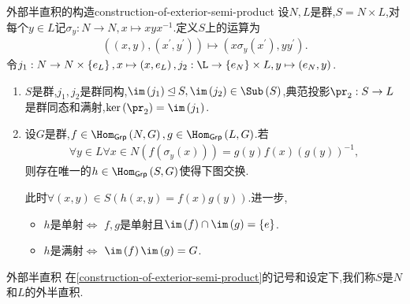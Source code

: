 \begin{proposition}{外部半直积的构造}{construction-of-exterior-semi-product}
	设$N,L$是群,$S=N\times L$,对每个$y\in L$记$\sigma_{y}:N\to N,x\mapsto xyx^{-1}$.定义$S$上的运算为
	\begin{align*}
		\left(\left(x,y\right),\left(x^{\prime},y^{\prime}\right)\right)\mapsto\left(x\sigma_{y}\left(x^{\prime}\right),yy^{\prime}\right).
	\end{align*}
	令$j_{1}:N\to N\times\left\{e_{L}\right\},x\mapsto\left(x,e_{L}\right),j_{2}:\L\to\left\{e_{N}\right\}\times L,y\mapsto\left(e_{N},y\right)$.
	\begin{enumerate}
		\item $S$是群,$j_{1},j_{2}$是群同构,$\im\left(j_{1}\right)\unlhd S,\im\left(j_{2}\right)\in\Sub\left(S\right)$,典范投影$\pr_{2}:S\to L$是群同态和满射,$\ker\left(\pr_{2}\right)=\im\left(j_{1}\right)$.
		\item 设$G$是群,$f\in\Hom_{\mathsf{Grp}}\left(N,G\right),g\in\Hom_{\mathsf{Grp}}\left(L,G\right)$.若
		\begin{align*}
			\forall y\in L\forall x\in N\left(f\left(\sigma_{y}\left(x\right)\right)\right)=g\left(y\right)f\left(x\right)\left(g\left(y\right)\right)^{-1},
		\end{align*}
		则存在唯一的$h\in\Hom_{\mathsf{Grp}}\left(S,G\right)$使得下图交换.
		\begin{center}
		\end{center}
		此时$\forall\left(x,y\right)\in S\left(h\left(x,y\right)=f\left(x\right)g\left(y\right)\right)$.进一步,
		\begin{itemize}
			\item $h$是单射$\iff$ $f,g$是单射且$\im\left(f\right)\cap\im\left(g\right)=\left\{e\right\}$.
			\item $h$是满射$\iff$ $\im\left(f\right)\im\left(g\right)=G$.
		\end{itemize}
	\end{enumerate}
\end{proposition}

\begin{definition}{外部半直积}{}
	在\cref{construction-of-exterior-semi-product}的记号和设定下,我们称$S$是$N$和$L$的外半直积.
\end{definition}

